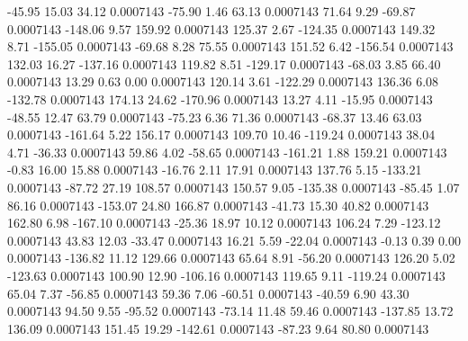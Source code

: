       -45.95       15.03       34.12     0.0007143
      -75.90        1.46       63.13     0.0007143
       71.64        9.29      -69.87     0.0007143
     -148.06        9.57      159.92     0.0007143
      125.37        2.67     -124.35     0.0007143
      149.32        8.71     -155.05     0.0007143
      -69.68        8.28       75.55     0.0007143
      151.52        6.42     -156.54     0.0007143
      132.03       16.27     -137.16     0.0007143
      119.82        8.51     -129.17     0.0007143
      -68.03        3.85       66.40     0.0007143
       13.29        0.63        0.00     0.0007143
      120.14        3.61     -122.29     0.0007143
      136.36        6.08     -132.78     0.0007143
      174.13       24.62     -170.96     0.0007143
       13.27        4.11      -15.95     0.0007143
      -48.55       12.47       63.79     0.0007143
      -75.23        6.36       71.36     0.0007143
      -68.37       13.46       63.03     0.0007143
     -161.64        5.22      156.17     0.0007143
      109.70       10.46     -119.24     0.0007143
       38.04        4.71      -36.33     0.0007143
       59.86        4.02      -58.65     0.0007143
     -161.21        1.88      159.21     0.0007143
       -0.83       16.00       15.88     0.0007143
      -16.76        2.11       17.91     0.0007143
      137.76        5.15     -133.21     0.0007143
      -87.72       27.19      108.57     0.0007143
      150.57        9.05     -135.38     0.0007143
      -85.45        1.07       86.16     0.0007143
     -153.07       24.80      166.87     0.0007143
      -41.73       15.30       40.82     0.0007143
      162.80        6.98     -167.10     0.0007143
      -25.36       18.97       10.12     0.0007143
      106.24        7.29     -123.12     0.0007143
       43.83       12.03      -33.47     0.0007143
       16.21        5.59      -22.04     0.0007143
       -0.13        0.39        0.00     0.0007143
     -136.82       11.12      129.66     0.0007143
       65.64        8.91      -56.20     0.0007143
      126.20        5.02     -123.63     0.0007143
      100.90       12.90     -106.16     0.0007143
      119.65        9.11     -119.24     0.0007143
       65.04        7.37      -56.85     0.0007143
       59.36        7.06      -60.51     0.0007143
      -40.59        6.90       43.30     0.0007143
       94.50        9.55      -95.52     0.0007143
      -73.14       11.48       59.46     0.0007143
     -137.85       13.72      136.09     0.0007143
      151.45       19.29     -142.61     0.0007143
      -87.23        9.64       80.80     0.0007143
